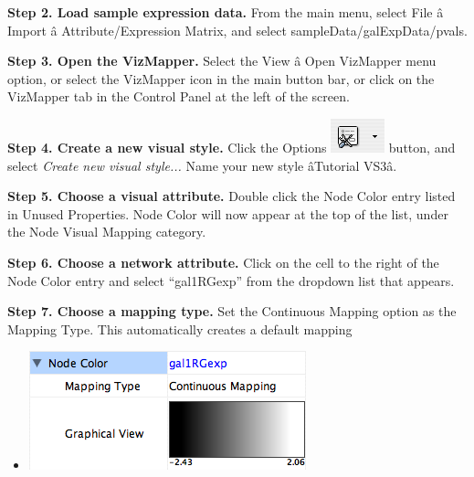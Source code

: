  \textbf{ Step 2. Load sample expression data.}
 From the main menu, select File \^a Import \^a Attribute/Expression Matrix, and select sampleData/galExpData/pvals. 


 \textbf{Step 3. Open the VizMapper.}
 Select the View \^a Open VizMapper menu option, or select the VizMapper icon in the main button bar, or click on the VizMapper tab in the Control Panel at the left of the screen. 


 \textbf{Step 4. Create a new visual style.}
 Click the Options \includegraphics[width=.6\textwidth]{images/VizMapOptionIcon.png}  button, and select \emph{Create new visual style...}
 Name your new style \^aTutorial VS3\^a. 


 \textbf{Step 5. Choose a visual attribute.}
 Double click the Node Color entry listed in Unused Properties. Node Color will now appear at the top of the list, under the Node Visual Mapping category. 


 \textbf{Step 6. Choose a network attribute.}
 Click on the cell to the right of the Node Color entry and select ``gal1RGexp'' from the dropdown list that appears. 


 \textbf{Step 7. Choose a mapping type.}
 Set the Continuous Mapping option as the Mapping Type. This automatically creates a default mapping 
\begin{itemize}
\item 

 \includegraphics[width=.6\textwidth]{images/DefaultColorGradient.png} 


\end{itemize}


